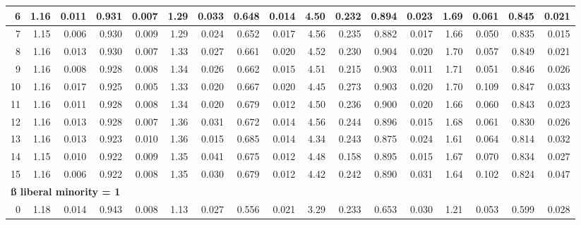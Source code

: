\documentclass[
]{article}
\begin{document}
\begin{table}[H]
{\begin{tabular}[t]{r|r|r|r|r|r|r|r|r|r|r|r|r|r|r|r|r}
\hline
\hspace{1em}6 & 1.16 & 0.011 & 0.931 & 0.007 & 1.29 & 0.033 & 0.648 & 0.014 & 4.50 & 0.232 & 0.894 & 0.023 & 1.69 & 0.061 & 0.845 & 0.021\\
\hline
\hspace{1em}7 & 1.15 & 0.006 & 0.930 & 0.009 & 1.29 & 0.024 & 0.652 & 0.017 & 4.56 & 0.235 & 0.882 & 0.017 & 1.66 & 0.050 & 0.835 & 0.015\\
\hline
\hspace{1em}8 & 1.16 & 0.013 & 0.930 & 0.007 & 1.33 & 0.027 & 0.661 & 0.020 & 4.52 & 0.230 & 0.904 & 0.020 & 1.70 & 0.057 & 0.849 & 0.021\\
\hline
\hspace{1em}9 & 1.16 & 0.008 & 0.928 & 0.008 & 1.34 & 0.026 & 0.662 & 0.015 & 4.51 & 0.215 & 0.903 & 0.011 & 1.71 & 0.051 & 0.846 & 0.026\\
\hline
\hspace{1em}10 & 1.16 & 0.017 & 0.925 & 0.005 & 1.33 & 0.020 & 0.667 & 0.020 & 4.45 & 0.273 & 0.903 & 0.020 & 1.70 & 0.109 & 0.847 & 0.033\\
\hline
\hspace{1em}11 & 1.16 & 0.011 & 0.928 & 0.008 & 1.34 & 0.020 & 0.679 & 0.012 & 4.50 & 0.236 & 0.900 & 0.020 & 1.66 & 0.060 & 0.843 & 0.023\\
\hline
\hspace{1em}12 & 1.16 & 0.013 & 0.928 & 0.007 & 1.36 & 0.031 & 0.672 & 0.014 & 4.56 & 0.244 & 0.896 & 0.015 & 1.68 & 0.061 & 0.830 & 0.026\\
\hline
\hspace{1em}13 & 1.16 & 0.013 & 0.923 & 0.010 & 1.36 & 0.015 & 0.685 & 0.014 & 4.34 & 0.243 & 0.875 & 0.024 & 1.61 & 0.064 & 0.814 & 0.032\\
\hline
\hspace{1em}14 & 1.15 & 0.010 & 0.922 & 0.009 & 1.35 & 0.041 & 0.675 & 0.012 & 4.48 & 0.158 & 0.895 & 0.015 & 1.67 & 0.070 & 0.834 & 0.027\\
\hline
\hspace{1em}15 & 1.16 & 0.006 & 0.922 & 0.008 & 1.35 & 0.030 & 0.679 & 0.012 & 4.42 & 0.242 & 0.890 & 0.031 & 1.64 & 0.102 & 0.824 & 0.047\\
\hline
\multicolumn{17}{l}{\textbf{ß liberal minority = 1}}\\
\hline
\hspace{1em}0 & 1.18 & 0.014 & 0.943 & 0.008 & 1.13 & 0.027 & 0.556 & 0.021 & 3.29 & 0.233 & 0.653 & 0.030 & 1.21 & 0.053 & 0.599 & 0.028\\

\end{tabular}}
\end{table}
\end{document}
